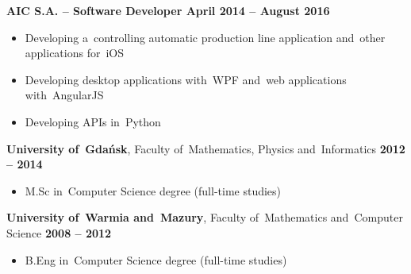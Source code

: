 \documentclass[11pt,a4paper]{article}
\newcommand*\header[1]{
    \noindent\raisebox{.1cm}{\color{MidnightBlue}\rule{1.5cm}{.1cm}\hspace{.2cm}\raisebox{-.1cm}{\large\bf #1}}}
\begin{document}
    \vspace{-.17cm}

    {\bf AIC S.A. -- Software Developer \hfill April 2014 -- August 2016}

    \vspace{-.23cm}
    \begin{itemize}[leftmargin=1.5cm] \itemsep.2mm \parskip0mm 
        \item Developing a~controlling automatic production line application and~other applications for~iOS
        \item Developing desktop applications with~WPF and~web applications with~AngularJS
        \item Developing APIs in~Python
    \end{itemize}


    \medskip
  
    \header{Education}
  
    \smallskip

    {{\bf University of~Gdańsk}, Faculty of~Mathematics, Physics and~Informatics \hfill {\bf 2012 -- 2014}}

    \vspace{-.23cm}
    \begin{itemize}[leftmargin=1.5cm] \itemsep.2mm \parskip0mm 
        \item[ ] M.Sc in~Computer Science degree (full-time studies)
    \end{itemize}

    \vspace{-.17cm}

    {{\bf University of~Warmia and~Mazury}, Faculty of~Mathematics and~Computer Science
        \hfill {\bf 2008 -- 2012}}

    \vspace{-.23cm}
    \begin{itemize}[leftmargin=1.5cm] \itemsep.2mm \parskip0mm 
        \item[ ] B.Eng in~Computer Science degree (full-time studies)
    \end{itemize}

    \vspace{-.17cm}
\end{document}
